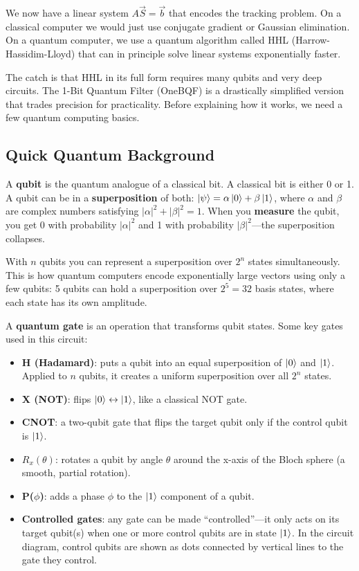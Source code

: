 \documentclass[11pt, a4paper]{article}
\begin{document}
We now have a linear system $A\vec{S} = \vec{b}$ that encodes the
tracking problem. On a classical computer we would just use conjugate
gradient or Gaussian elimination. On a quantum computer, we use a
quantum algorithm called HHL (Harrow-Hassidim-Lloyd) that can in
principle solve linear systems exponentially faster.

The catch is that HHL in its full form requires many qubits and very deep
circuits. The 1-Bit Quantum Filter (OneBQF) is a drastically simplified
version that trades precision for practicality. Before explaining how it
works, we need a few quantum computing basics.

\subsection{Quick Quantum Background}

A \textbf{qubit} is the quantum analogue of a classical bit. A classical
bit is either 0 or 1. A qubit can be in a \textbf{superposition} of both:
$\ket{\psi} = \alpha\ket{0} + \beta\ket{1}$, where $\alpha$ and $\beta$
are complex numbers satisfying $|\alpha|^2 + |\beta|^2 = 1$. When you
\textbf{measure} the qubit, you get 0 with probability $|\alpha|^2$ and 1
with probability $|\beta|^2$---the superposition collapses.

With $n$ qubits you can represent a superposition over $2^n$ states
simultaneously. This is how quantum computers encode exponentially large
vectors using only a few qubits: 5 qubits can hold a superposition over
$2^5 = 32$ basis states, where each state has its own amplitude.

A \textbf{quantum gate} is an operation that transforms qubit states. Some
key gates used in this circuit:
\begin{itemize}
    \item \textbf{H (Hadamard)}: puts a qubit into an equal superposition
          of $\ket{0}$ and $\ket{1}$. Applied to $n$ qubits, it creates a
          uniform superposition over all $2^n$ states.
    \item \textbf{X (NOT)}: flips $\ket{0} \leftrightarrow \ket{1}$, like
          a classical NOT gate.
    \item \textbf{CNOT}: a two-qubit gate that flips the target qubit only
          if the control qubit is $\ket{1}$.
    \item \textbf{$R_x(\theta)$}: rotates a qubit by angle $\theta$ around
          the x-axis of the Bloch sphere (a smooth, partial rotation).
    \item \textbf{P($\phi$)}: adds a phase $\phi$ to the $\ket{1}$
          component of a qubit.
    \item \textbf{Controlled gates}: any gate can be made
          ``controlled''---it only acts on its target qubit(s) when one or
          more control qubits are in state $\ket{1}$. In the circuit
          diagram, control qubits are shown as dots connected by vertical
          lines to the gate they control.
\end{itemize}
\end{document}
